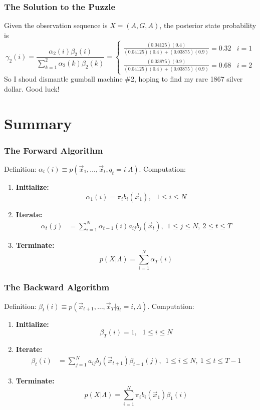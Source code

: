 \documentclass{beamer}
\begin{document}
\begin{frame}
  \frametitle{The Solution to the Puzzle}

  Given the observation sequence is $X=(A,G,A)$, 
  the posterior state probability is
  \[
  \gamma_2(i)=\frac{\alpha_2(i)\beta_2(i)}{\sum_{k=1}^2\alpha_2(k)\beta_2(k)}
  = \begin{cases}
    \frac{(0.04125)(0.4)}{(0.04125)(0.4)+(0.03875)(0.9)} = 0.32 & i=1\\
    \frac{(0.03875)(0.9)}{(0.04125)(0.4)+(0.03875)(0.9)} = 0.68 & i=2
  \end{cases}
  \]
  So I shoud dismantle gumball machine \#2, hoping to find my rare
  1867 silver dollar.  Good luck!
\end{frame}

\section[Summary]{Summary}
\setcounter{subsection}{1}

\begin{frame}
  \frametitle{The Forward Algorithm}

  Definition: $\alpha_t(i) \equiv p(\vec{x}_1,\ldots,\vec{x}_t,q_t=i|\Lambda)$.  Computation:
  \begin{enumerate}
  \item {\bf Initialize:}
    \[
    \alpha_1(i) = \pi_i b_i(\vec{x}_1),~~~1\le i\le N
    \]
  \item {\bf Iterate:}
    \begin{align*}
      \alpha_{t}(j) &= \sum_{i=1}^N \alpha_{t-1}(i) a_{ij}b_j(\vec{x}_t),~~1\le j\le N,~2\le t\le T
    \end{align*}
  \item {\bf Terminate:}
    \[
    p(X|\Lambda) = \sum_{i=1}^N \alpha_T(i)
    \]
  \end{enumerate}
\end{frame}
  
\begin{frame}
  \frametitle{The Backward Algorithm}

  Definition: $\beta_t(i) \equiv p(\vec{x}_{t+1},\ldots,\vec{x}_T|q_t=i,\Lambda)$.  Computation:
  \begin{enumerate}
  \item {\bf Initialize:}
    \[
    \beta_T(i) = 1,~~~1\le i\le N
    \]
  \item {\bf Iterate:}
    \begin{align*}
      \beta_{t}(i) &= \sum_{j=1}^N a_{ij}b_j(\vec{x}_{t+1})\beta_{t+1}(j),~~1\le i\le N,~1\le t\le T-1
    \end{align*}
  \item {\bf Terminate:}
    \[
    p(X|\Lambda) = \sum_{i=1}^N \pi_ib_i(\vec{x}_1)\beta_1(i)
    \]
  \end{enumerate}
\end{frame}
\end{document}
